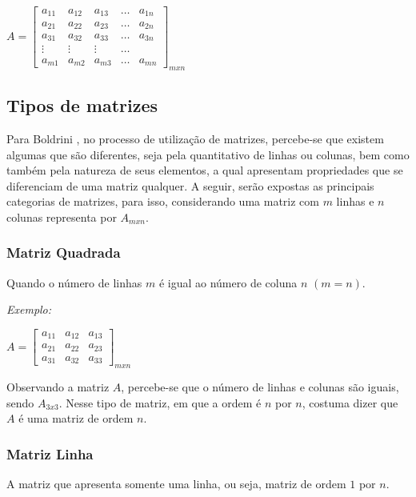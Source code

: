 \begin{center}
    $A = 
    \begin{bmatrix}
        a_{11} & a_{12} & a_{13} & \ldots & a_{1n}\\ 
        a_{21} & a_{22} & a_{23} & \ldots & a_{2n}\\ 
        a_{31} & a_{32} & a_{33} & \ldots & a_{3n}\\ 
        \vdots & \vdots & \vdots & \ldots & \\ 
        a_{m1} & a_{m2} & a_{m3} & \ldots & a_{mn}
    \end{bmatrix}_{mxn}$
\end{center}

%
\subsection{Tipos de matrizes}
\noindent Para Boldrini \cite{1980:Boldrini}, no processo de utilização de matrizes, percebe-se que existem algumas que são diferentes, seja pela quantitativo de linhas ou colunas, bem como também pela natureza de seus elementos, a qual apresentam propriedades que se diferenciam de uma matriz qualquer. A seguir, serão expostas as principais categorias de matrizes, para isso, considerando uma matriz com $m$ linhas e $n$ colunas representa por $A{}_{mxn}$.

\subsubsection{Matriz Quadrada}
\noindent Quando o número de linhas $m$ é igual ao número de coluna $n$ $(m = n)$.

\textit{Exemplo:}
\begin{center}
    $A = 
    \begin{bmatrix}
        a_{11} & a_{12} & a_{13} \\ 
        a_{21} & a_{22} & a_{23} \\ 
        a_{31} & a_{32} & a_{33} 
    \end{bmatrix}_{mxn}$
\end{center}

Observando a matriz $A$, percebe-se que o número de linhas e colunas são iguais, sendo $A{}_{3x3}$. Nesse tipo de matriz, em que a ordem é $n$ por $n$, costuma dizer que $A$ é uma matriz de ordem $n$.

\subsubsection{Matriz Linha}
\noindent A matriz que apresenta somente uma linha, ou seja, matriz de ordem $1$ por $n$.


